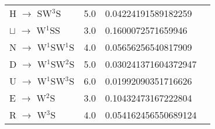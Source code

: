 \documentclass[12pt]{article}
\begin{document}
\begin{tabular}{l l l l}
H $\rightarrow$ SW{$^{3}$}S	&	5.0	&	0.04224191589182259\\
$\sqcup$ $\rightarrow$ W{$^{1}$}SS	&	3.0	&	0.1600072571659946\\
N $\rightarrow$ W{$^{1}$}SW{$^{1}$}S	&	4.0	&	0.05656256540817909\\
D $\rightarrow$ W{$^{1}$}SW{$^{2}$}S	&	5.0	&	0.030241371604372947\\
U $\rightarrow$ W{$^{1}$}SW{$^{3}$}S	&	6.0	&	0.01992090351716626\\
E $\rightarrow$ W{$^{2}$}S	&	3.0	&	0.10432473167222804\\
R $\rightarrow$ W{$^{3}$}S	&	4.0	&	0.054162456550689124\\
\end{tabular}
\end{document}
